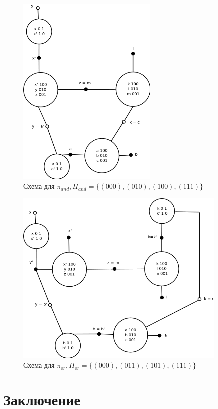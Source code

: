 \documentclass[12pt]{extarticle}
\begin{document}
\begin{figure}[htb]
\centering
\includegraphics[width=0.6\textwidth]{min_and.png}
\caption{Схема для $\pi_{and}, \Pi_{and} = \{ (000), (010), (100), (111) \}$}
\label{fig:and}
\end{figure}

\begin{figure}[htb]
\centering
\includegraphics[width=0.9\textwidth]{min_or.png}
\caption{Схема для $\pi_{or}, \Pi_{or} = \{ (000), (011), (101), (111) \}$}
\label{fig:or}
\end{figure}

\clearpage
\section{Заключение}
\end{document}
